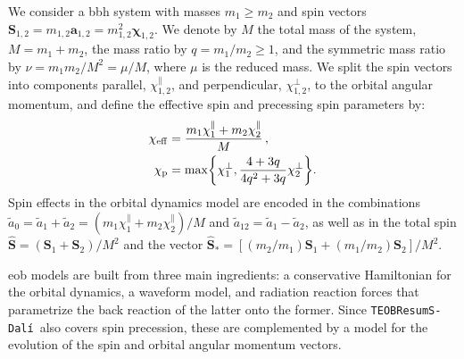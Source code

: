 \documentclass[prd,amssymb,amsmath,amsfonts,nofootinbib,reprint,showpacs,longbibliography]{revtex4-1}
\newcommand{\mbf}[1]{\mathbf{#1}}
\newcommand{\dali}[0]{\texttt{TEOBResumS-Dalí}}
\begin{document}
We consider a \ac{bbh} system with masses $m_1 \geq m_2$ and spin vectors $\mbf{S}_{1,2} = m_{1,2} \bm{a}_{1,2} =
m_{1,2}^2 \bm{\chi}_{1,2}$. We denote by $M$ the total mass of the system, $M = m_1 + m_2$, the mass ratio
by $q = m_1/m_2 \geq 1$, and the symmetric mass ratio by $\nu = m_1m_2/M^2 = \mu/M$, where $\mu$ is the reduced
mass. We split the spin vectors into components parallel, $\chi_{1,2}^{\parallel}$, and perpendicular,
$\chi_{1,2}^{\perp}$, to the orbital angular momentum, and define the effective spin and precessing spin
parameters by:
\begin{subequations}
\begin{align}
\chi_{\rm eff} &= \frac{m_1 \chi_1^{\parallel} + m_2 \chi_2^{\parallel}}{M} \, , \\
\chi_{\rm p}   &= \max \biggl\{ \chi_1^\perp, \dfrac{4+3q}{4q^2+3q} \chi_2^\perp \biggr\}.
\end{align}
\end{subequations}
Spin effects in the orbital dynamics model are encoded in the combinations $\tilde{a}_0 = \tilde{a}_1 +
\tilde{a}_2 = (m_1\chi_1^\parallel + m_2 \chi_2^\parallel)/M$ and $\tilde{a}_{12} = \tilde{a}_1 - \tilde{a}_2$,
as well as in the total spin $\hat{\bm{S}} = (\bm{S}_1 + \bm{S}_2)/M^2$ and the vector $\hat{\bm{S}}_* = 
\left[(m_2/m_1) \bm{S}_1 + (m_1/m_2) \bm{S}_2\right]/M^2$.


\ac{eob} models are built from three main ingredients: a conservative Hamiltonian for the orbital dynamics,
a waveform model, and radiation reaction forces that parametrize the back reaction of the latter onto the former.
Since \dali~also covers spin precession, these are complemented by a model for the evolution of the spin
and orbital angular momentum vectors.
\end{document}
